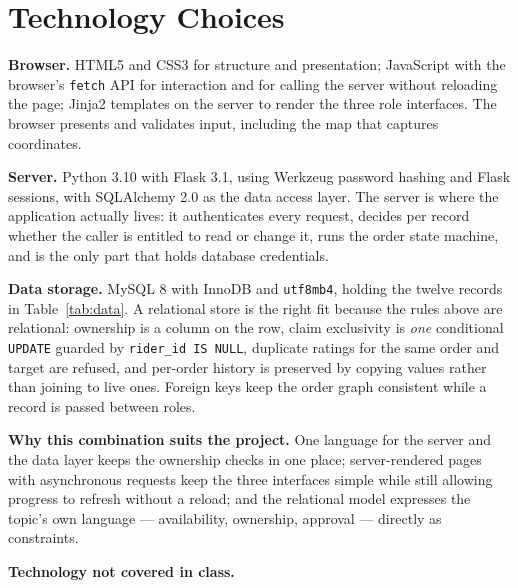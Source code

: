 \section{Technology Choices}

\noindent\textbf{Browser.} HTML5 and CSS3 for structure and presentation; JavaScript with the
browser's \texttt{fetch} API for interaction and for calling the server without reloading the
page; Jinja2 templates
on the server to render the three role interfaces. The browser presents and validates input,
including the map that captures coordinates.

\noindent\textbf{Server.} Python 3.10 with Flask 3.1, using Werkzeug password hashing and Flask
sessions, with SQLAlchemy 2.0 as the data access layer. The server is where the application
actually lives: it authenticates every request, decides per record whether the caller is
entitled to read or change it, runs the order state machine, and is the only part that holds
database credentials.

\noindent\textbf{Data storage.} MySQL 8 with InnoDB and \texttt{utf8mb4}, holding the twelve
records in Table~\ref{tab:data}. A relational store is the right fit because the rules above are
relational: ownership is a column on the row, claim exclusivity is \emph{one} conditional
\texttt{UPDATE} guarded by \texttt{rider\_id IS NULL}, duplicate ratings for the same order
and target are refused, and per-order history is preserved by copying values rather than joining to live
ones. Foreign keys keep the order graph consistent while a record is passed between roles.

\noindent\textbf{Why this combination suits the project.} One language for the server and the
data layer keeps the ownership checks in one place; server-rendered pages with asynchronous requests keep the three interfaces simple while still allowing
progress to refresh without a reload; and the relational model expresses the topic's own
language --- availability, ownership, approval --- directly as constraints.

\noindent\textbf{Technology not covered in class.}

